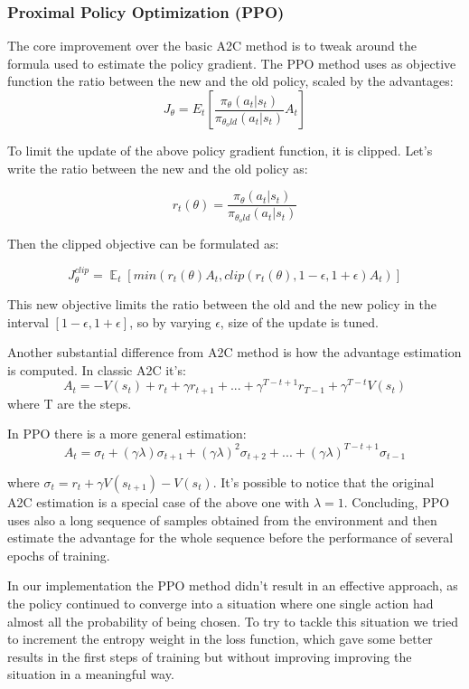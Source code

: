 \documentclass[12pt]{article}
\DeclareMathOperator{\EX}{\mathbb{E}}%
\begin{document}
\subsubsection{Proximal Policy Optimization (PPO)}
The core improvement over the basic A2C method is to tweak around the formula used to estimate the policy gradient. The PPO method \cite{ppo} uses as objective function the ratio between the new and the old policy, scaled by the advantages:
\[ J_\theta = E_t[\frac{\pi_\theta(a_t | s_t)}{\pi_{\theta_old}(a_t | s_t)} A_t] \]

To limit the update of the above policy gradient function, it is clipped.
Let's write the ratio between the new and the old policy as:

\[ r_t(\theta) = \frac{\pi_\theta(a_t | s_t)}{\pi_{\theta_old}(a_t | s_t)}\]

Then the clipped objective can be formulated as:

\[J_\theta^{clip} = \EX_t[min(r_t(\theta)A_t, clip(r_t(\theta), 1-\epsilon, 1+\epsilon)A_t)]\]

This new objective limits the ratio between the old and the new policy in the interval $[1-\epsilon, 1+\epsilon]$, so by varying $\epsilon$, size of the update is tuned.

Another substantial difference from A2C method is how the advantage estimation is computed. In classic A2C it's:
\[ A_t = -V(s_t) + r_t + \gamma r_{t+1} + ... + \gamma^{T - t +1} r_{T-1} + \gamma^{T - t}V(s_t)\]
where T are the steps.

In PPO there is a more general estimation:
\[ A_t = \sigma_t + (\gamma \lambda)\sigma_{t+1} + (\gamma \lambda)^2 \sigma_{t+2} + ... + (\gamma \lambda)^{T-t+1}\sigma_{t-1}\]

where $\sigma_t = r_t + \gamma V(s_{t+1})- V(s_t)$. It's possible to notice that the original A2C estimation is a special case of the above one with $\lambda=1$.
Concluding, PPO uses also a long sequence of samples obtained from the environment and then estimate the advantage for the whole sequence before the performance of several epochs of training.

In our implementation the PPO method didn't result in an effective approach, as the policy continued to converge into a situation where one single action had almost all the probability of being chosen. To try to tackle this situation we tried to increment the entropy weight in the loss function, which gave some better results in the first steps of training but without improving improving the situation in a meaningful way.
\end{document}
